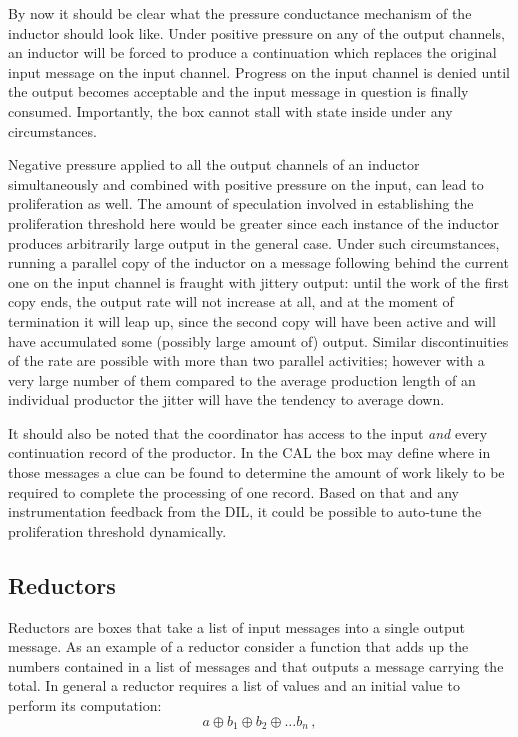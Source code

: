 \documentclass[11pt]{report}
\begin{document}
By now it should be clear what the pressure conductance mechanism of the inductor should look like. Under positive pressure on any of the output channels,
an inductor will be forced to produce a continuation which replaces the original input message on the input channel. Progress on the input channel is
denied until the output becomes acceptable and the input message in question is finally consumed. Importantly, the box cannot stall with state inside
under any circumstances.

Negative pressure applied to all the output channels of an inductor simultaneously and combined  with positive pressure on the input, can lead to
proliferation as well. The amount of speculation involved in establishing the proliferation threshold here would be greater since each instance of
the inductor produces arbitrarily large output in the general case. Under such circumstances, running a parallel copy of the inductor on a message following behind the current one on the input channel is fraught with jittery output: until the work of the first copy ends, the output rate
will not increase at all, and at the moment of termination it will leap up, since the second copy will have been active and will have accumulated
some (possibly large amount of) output. Similar discontinuities of the rate are possible with more than two
parallel activities; however with a very large number of them compared to the average production length of an individual productor the
jitter will have the tendency to average down.

It should also be noted that the coordinator has access to the input {\em and} every continuation record of the productor. In the CAL
the box may define where in those messages a clue can be found to determine the amount of work likely to be required to complete the
processing of one record. Based on that and any instrumentation feedback from the DIL, it could be possible to auto-tune the proliferation
threshold dynamically.

\subsection{Reductors}

Reductors are boxes that take a list of input messages into a single output message. As an example of a reductor consider a function
that adds up the numbers contained in a list of messages and that outputs a message carrying the total. In general a reductor requires
a list of values and an initial value to perform its computation:
\[
a\oplus b_1\oplus b_2\oplus \ldots b_n\,,
\]
\end{document}
